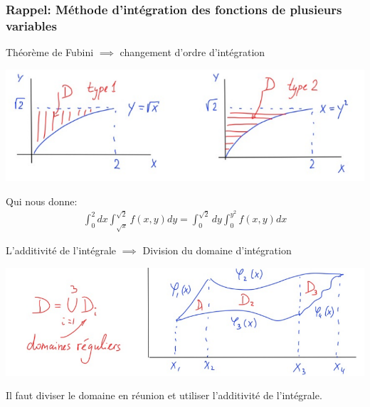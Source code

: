 \subsubsection{Rappel: Méthode d'intégration des fonctions de plusieurs variables}


\begin{parag}{Théorème de Fubini $\implies$ changement d'ordre d'intégration}
   \begin{center}
       \includegraphics[scale=0.8]{12025-05-26.png}
   \end{center}
   Qui nous donne:
   \begin{align*} 
       \int_0^2dx\int_{\sqrt{x}}^{\sqrt{2}}f\left(x, y\right) dy =  \int_{0}^{\sqrt{2}}dy\int_0^{y^2}f\left(x, y\right)dx
   \end{align*}
\end{parag}
\begin{parag}{L'additivité de l'intégrale $\implies$ Division du domaine d'intégration}
    \begin{center}
        \includegraphics[scale=0.8]{22025-05-26.png}
    \end{center}
    Il faut diviser le domaine en réunion et utiliser l'additivité de l'intégrale.
    
    
\end{parag}
